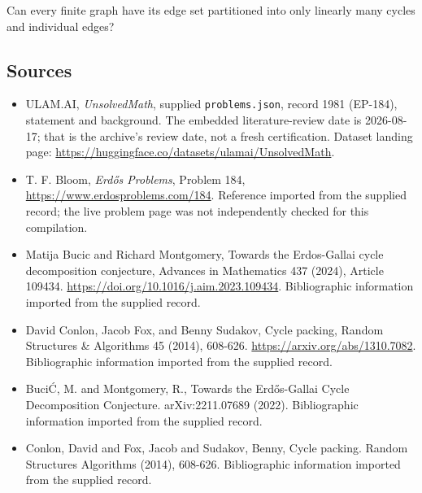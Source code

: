 \documentclass[11pt,a4paper]{article}
\begin{document}
Can every finite graph have its edge set partitioned into only linearly many cycles and individual edges?

\subsection{Sources}

{\small

\begin{itemize}

\item[\hypertarget{source:1981:1}{S1}] ULAM.AI, \emph{UnsolvedMath}, supplied \texttt{problems.json}, record 1981 (EP-184), statement and background. The embedded literature-review date is 2026-08-17; that is the archive’s review date, not a fresh certification. Dataset landing page: \url{https://huggingface.co/datasets/ulamai/UnsolvedMath}.

\item[\hypertarget{source:1981:2}{S2}] T. F. Bloom, \emph{Erdős Problems}, Problem 184, \url{https://www.erdosproblems.com/184}. Reference imported from the supplied record; the live problem page was not independently checked for this compilation.

\item[\hypertarget{source:1981:3}{S3}] Matija Bucic and Richard Montgomery, Towards the Erdos-Gallai cycle decomposition conjecture, Advances in Mathematics 437 (2024), Article 109434. \url{https://doi.org/10.1016/j.aim.2023.109434}. Bibliographic information imported from the supplied record.

\item[\hypertarget{source:1981:4}{S4}] David Conlon, Jacob Fox, and Benny Sudakov, Cycle packing, Random Structures \& Algorithms 45 (2014), 608-626. \url{https://arxiv.org/abs/1310.7082}. Bibliographic information imported from the supplied record.

\item[\hypertarget{source:1981:5}{S5}] Buci\'C, M. and Montgomery, R., Towards the Erd\H{o}s-Gallai Cycle Decomposition Conjecture. arXiv:2211.07689 (2022). Bibliographic information imported from the supplied record.

\item[\hypertarget{source:1981:6}{S6}] Conlon, David and Fox, Jacob and Sudakov, Benny, Cycle packing. Random Structures Algorithms (2014), 608-626. Bibliographic information imported from the supplied record.

\end{itemize}

}

\label{end:1981}
\end{document}
